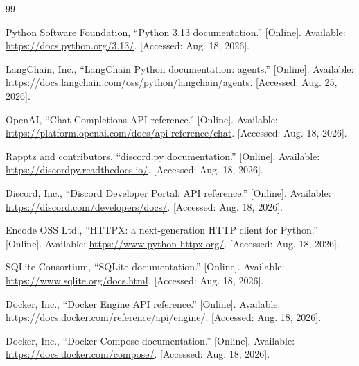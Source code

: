 \documentclass[11pt,a4paper]{article}
\let\stdsection\section
\renewcommand{\section}{\clearpage\stdsection}
\begin{document}
\clearpage
{}
\begingroup
\let\section\stdsection
\begin{thebibliography}{99}
\setlength{\itemsep}{4pt}

Python Software Foundation, ``Python 3.13 documentation.'' [Online].
Available: \url{https://docs.python.org/3.13/}. [Accessed: Aug. 18, 2026].

LangChain, Inc., ``LangChain Python documentation: agents.'' [Online].
Available: \url{https://docs.langchain.com/oss/python/langchain/agents}. [Accessed: Aug. 25, 2026].

OpenAI, ``Chat Completions API reference.'' [Online].
Available: \url{https://platform.openai.com/docs/api-reference/chat}. [Accessed: Aug. 18, 2026].

Rapptz and contributors, ``discord.py documentation.'' [Online].
Available: \url{https://discordpy.readthedocs.io/}. [Accessed: Aug. 18, 2026].

Discord, Inc., ``Discord Developer Portal: API reference.'' [Online].
Available: \url{https://discord.com/developers/docs/}. [Accessed: Aug. 18, 2026].

Encode OSS Ltd., ``HTTPX: a next-generation HTTP client for Python.'' [Online].
Available: \url{https://www.python-httpx.org/}. [Accessed: Aug. 18, 2026].

SQLite Consortium, ``SQLite documentation.'' [Online].
Available: \url{https://www.sqlite.org/docs.html}. [Accessed: Aug. 18, 2026].

Docker, Inc., ``Docker Engine API reference.'' [Online].
Available: \url{https://docs.docker.com/reference/api/engine/}. [Accessed: Aug. 18, 2026].

Docker, Inc., ``Docker Compose documentation.'' [Online].
Available: \url{https://docs.docker.com/compose/}. [Accessed: Aug. 18, 2026].


\end{thebibliography}
\end{document}
